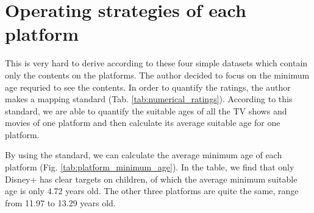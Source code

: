 \documentclass{article}
\begin{document}

\section{Operating strategies of each platform}
This is very hard to derive according to these four simple datasets which contain 
only the contents on the platforms. The author decided to focus on the minimum age 
requried to see the contents. In order to quantify the ratings, the author makes a 
mapping standard (Tab. \ref{tab:numerical_ratings}). According to this standard, 
we are able to quantify the suitable ages of all the TV shows and movies of one 
platform and then calculate its average suitable age for one platform.

By using the standard, we can calculate the average minimum age of each platform 
(Fig. \ref{tab:platform_minimum_age}). In the table, we find that only Disney+ 
has clear targets on children, of which the average minimum suitable age is only 
4.72 years old. The other three platforms are quite the same, range from 11.97 to 
13.29 years old.
\end{document}
